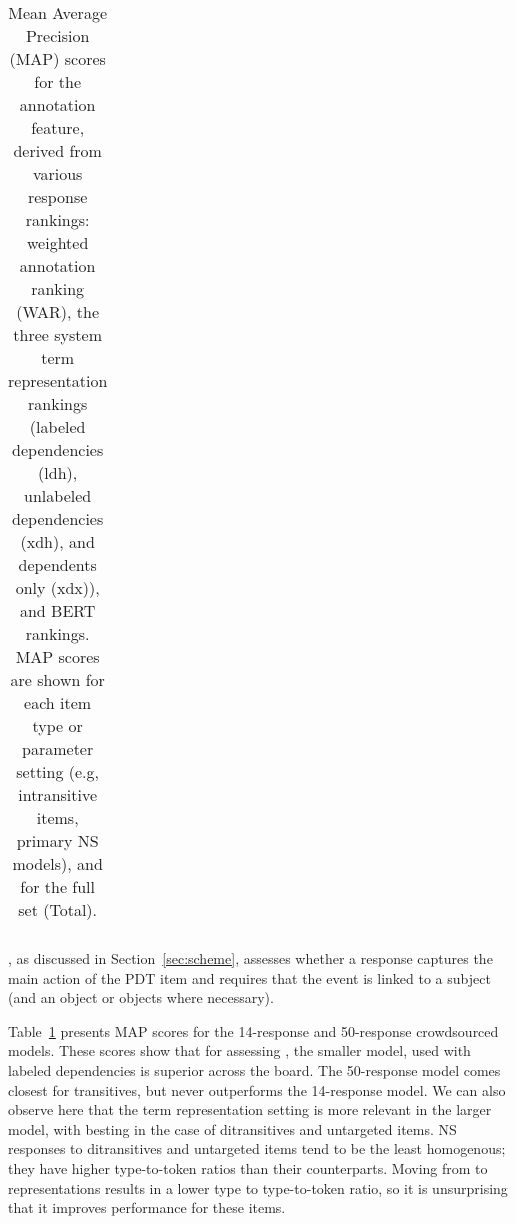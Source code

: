 \begin{table}[htb!]
\begin{center}
\begin{tabular}{|l||l|l|l||l|l||l|l|l||l|l|}
\end{tabular}
\caption{\label{tab:core-map}Mean Average Precision (MAP) scores for the  annotation feature, derived from various response rankings: weighted annotation ranking (WAR), the three system term representation rankings (labeled dependencies (ldh), unlabeled dependencies (xdh), and dependents only (xdx)), and BERT rankings. MAP scores are shown for each item type or parameter setting (e.g, intransitive items, primary NS models), and for the full set (Total).
}
\end{center}
\end{table}


, as discussed in Section~\ref{sec:scheme}, assesses whether a response captures the main action of the PDT item and requires that the event is linked to a subject (and an object or objects where necessary).

Table~\ref{tab:core-map} presents  MAP scores for the 14-response and 50-response crowdsourced models. These scores show that for assessing , the smaller model, used with labeled dependencies is superior across the board. The 50-response model comes closest for transitives, but never outperforms the 14-response model. We can also observe here that the term representation setting is more relevant in the larger model, with  besting  in the case of ditransitives and untargeted items. NS responses to ditransitives and untargeted items tend to  be the least homogenous; they have higher type-to-token ratios  than their counterparts. Moving from  to  representations results in a lower type to type-to-token ratio, so it is unsurprising that it improves performance for these items.

